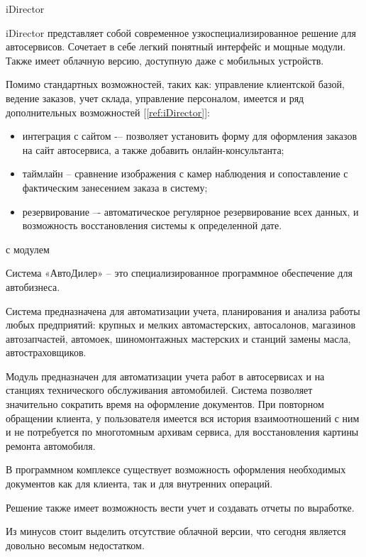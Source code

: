 iDirector

iDirector представляет собой современное узкоспециализированное решение для
 автосервисов. Сочетает в себе легкий понятный интерфейс
и мощные модули. Также имеет облачную версию, доступную даже с мобильных
устройств.

Помимо стандартных возможностей, таких как: управление клиентской базой, ведение
заказов, учет склада, управление персоналом, имеется и ряд дополнительных
возможностей [\ref{ref:iDirector}]:
\begin{itemize}
	\item интеграция с сайтом -– позволяет установить форму для оформления
		заказов на сайт автосервиса, а также добавить онлайн-консультанта;
	\item таймлайн -- сравнение изображения с камер наблюдения и сопоставление с
		фактическим занесением заказа в систему;
	\item резервирование –- автоматическое регулярное резервирование всех
		данных, и возможность восстановления системы к определенной дате.
	\\[\baselineskip]
\end{itemize}


 с модулем 

Система «АвтоДилер» -- это специализированное программное обеспечение для
автобизнеса.

Система предназначена для автоматизации учета, планирования и анализа работы
любых предприятий: крупных и мелких автомастерских, автосалонов, магазинов
автозапчастей, автомоек, шиномонтажных мастерских и станций замены масла,
автостраховщиков.

Модуль  предназначен для автоматизации учета работ в автосервисах и на
станциях технического обслуживания автомобилей. Система позволяет значительно
сократить время на оформление документов. При повторном обращении клиента, у
пользователя имеется вся история взаимоотношений с ним и не потребуется
 по многотомным архивам сервиса, для восстановления картины
ремонта автомобиля.

В программном комплексе существует возможность оформления необходимых документов
как для клиента, так и для внутренних операций.

Решение также имеет возможность вести учет и создавать отчеты по выработке.

Из минусов стоит выделить отсутствие облачной версии, что сегодня является
довольно весомым недостатком.
